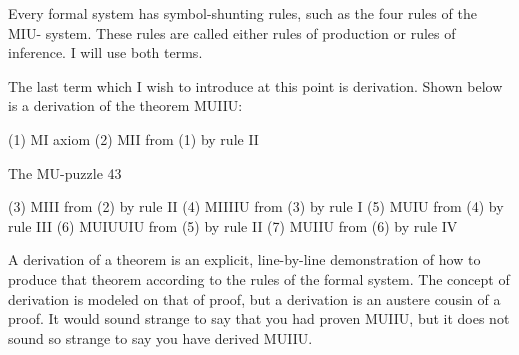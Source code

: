 Every formal system has symbol-shunting rules, such as the four rules of the MIU-
system. These rules are called either rules of production or rules of inference. I will use
both terms.

The last term which I wish to introduce at this point is derivation. Shown below is a
derivation of the theorem MUIIU:

      (1) MI                            axiom
      (2) MII                           from (1) by rule II


The MU-puzzle                                                                           43

      (3) MIII                         from (2) by rule II
      (4) MIIIIU                       from (3) by rule I
      (5) MUIU                         from (4) by rule III
      (6) MUIUUIU                      from (5) by rule II
      (7) MUIIU                        from (6) by rule IV

A derivation of a theorem is an explicit, line-by-line demonstration of how to produce
that theorem according to the rules of the formal system. The concept of derivation is
modeled on that of proof, but a derivation is an austere cousin of a proof. It would sound
strange to say that you had proven MUIIU, but it does not sound so strange to say you
have derived MUIIU.

